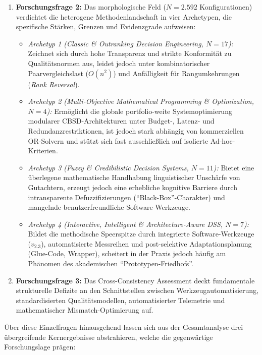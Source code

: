 \begin{enumerate}[label=\textbf{\arabic*.}, leftmargin=*]
  \item \textbf{Forschungsfrage 2:} Das morphologische Feld ($N = 2.592$ Konfigurationen) verdichtet die heterogene Methodenlandschaft in vier Archetypen, die spezifische Stärken, Grenzen und Evidenzgrade aufweisen:
  \begin{itemize}[leftmargin=*]
    \item \textit{Archetyp 1 (Classic \& Outranking Decision Engineering, $N = 17$):} Zeichnet sich durch hohe Transparenz und strikte Konformität zu Qualitätsnormen aus, leidet jedoch unter kombinatorischer Paarvergleichslast ($O(n^2)$) und Anfälligkeit für Rangumkehrungen (\textit{Rank Reversal}).
    \item \textit{Archetyp 2 (Multi-Objective Mathematical Programming \& Optimization, $N = 4$):} Ermöglicht die globale portfolio-weite Systemoptimierung modularer CBSD-Architekturen unter Budget-, Latenz- und Redundanzrestriktionen, ist jedoch stark abhängig von kommerziellen OR-Solvern und stützt sich fast ausschließlich auf isolierte Ad-hoc-Kriterien.
    \item \textit{Archetyp 3 (Fuzzy \& Credibilistic Decision Systems, $N = 11$):} Bietet eine überlegene mathematische Handhabung linguistischer Unschärfe von Gutachtern, erzeugt jedoch eine erhebliche kognitive Barriere durch intransparente Defuzzifizierungen (\enquote{Black-Box}-Charakter) und mangelnde benutzerfreundliche Software-Werkzeuge.
    \item \textit{Archetyp 4 (Interactive, Intelligent \& Architecture-Aware DSS, $N = 7$):} Bildet die methodische Speerspitze durch integrierte Software-Werkzeuge ($v_{2.3}$), automatisierte Messreihen und post-selektive Adaptationsplanung (Glue-Code, Wrapper), scheitert in der Praxis jedoch häufig am Phänomen des akademischen \enquote{Prototypen-Friedhofs}.
  \end{itemize}

  \item \textbf{Forschungsfrage 3:} Das Cross-Consistency Assessment deckt fundamentale strukturelle Defizite an den Schnittstellen zwischen Werkzeugautomatisierung, standardisierten Qualitätsmodellen, automatisierter Telemetrie und mathematischer Mismatch-Optimierung auf.
\end{enumerate}

Über diese Einzelfragen hinausgehend lassen sich aus der Gesamtanalyse drei übergreifende Kernergebnisse abstrahieren, welche die gegenwärtige Forschungslage prägen:

